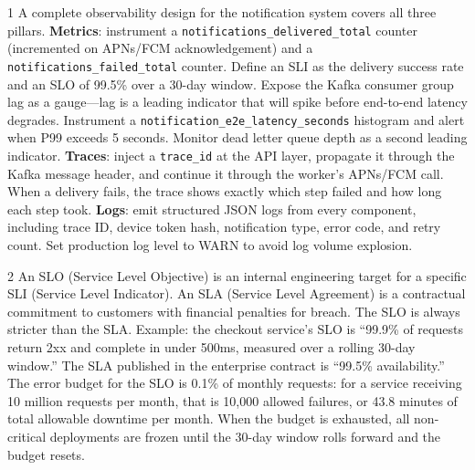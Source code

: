 \documentclass[11pt,a4paper]{article}
\begin{document}
\begin{answerbox}{1}
  A complete observability design for the notification system covers all three pillars. \textbf{Metrics}: instrument a \texttt{notifications\_delivered\_total} counter (incremented on APNs/FCM acknowledgement) and a \texttt{notifications\_failed\_total} counter. Define an SLI as the delivery success rate and an SLO of 99.5\% over a 30-day window. Expose the Kafka consumer group lag as a gauge---lag is a leading indicator that will spike before end-to-end latency degrades. Instrument a \texttt{notification\_e2e\_latency\_seconds} histogram and alert when P99 exceeds 5 seconds. Monitor dead letter queue depth as a second leading indicator. \textbf{Traces}: inject a \texttt{trace\_id} at the API layer, propagate it through the Kafka message header, and continue it through the worker's APNs/FCM call. When a delivery fails, the trace shows exactly which step failed and how long each step took. \textbf{Logs}: emit structured JSON logs from every component, including trace ID, device token hash, notification type, error code, and retry count. Set production log level to WARN to avoid log volume explosion.
\end{answerbox}

\begin{answerbox}{2}
  An SLO (Service Level Objective) is an internal engineering target for a specific SLI (Service Level Indicator). An SLA (Service Level Agreement) is a contractual commitment to customers with financial penalties for breach. The SLO is always stricter than the SLA. Example: the checkout service's SLO is ``99.9\% of requests return 2xx and complete in under 500ms, measured over a rolling 30-day window.'' The SLA published in the enterprise contract is ``99.5\% availability.'' The error budget for the SLO is 0.1\% of monthly requests: for a service receiving 10 million requests per month, that is 10,000 allowed failures, or 43.8 minutes of total allowable downtime per month. When the budget is exhausted, all non-critical deployments are frozen until the 30-day window rolls forward and the budget resets.
\end{answerbox}
\end{document}
